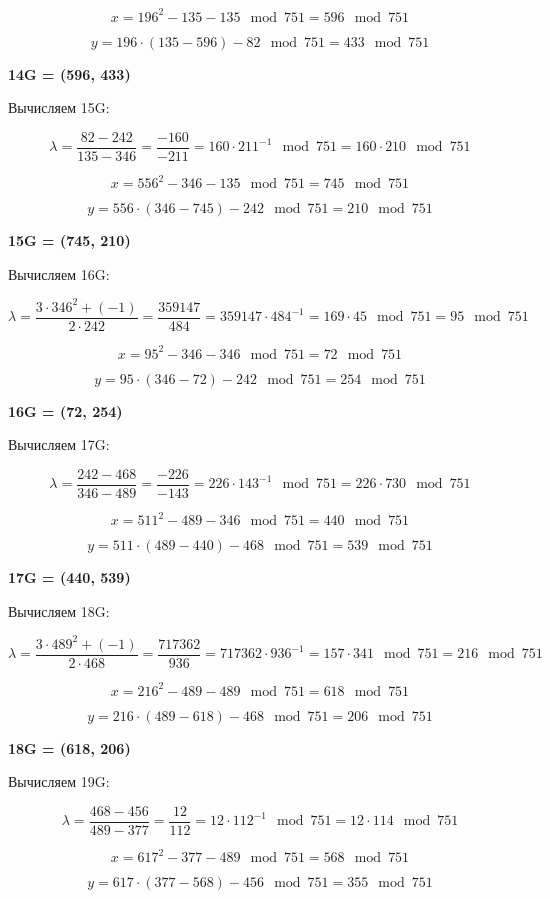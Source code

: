 \[
x = 196^2 - 135 - 135 \mod{751} = 596\mod{751}
\]


\[
y = 196 \cdot (135 - 596) - 82\mod{751} = 433\mod{751}
\]

\textbf{14G = (596, 433)}

Вычисляем 15G:

\[
\lambda = \frac{82-242}{135-346} = \frac{-160}{-211} = 160 \cdot 211^{-1}\mod{751} = 160 \cdot 210\mod{751}
\]


\[
x = 556^2 - 346 - 135 \mod{751} = 745\mod{751}
\]


\[
y = 556 \cdot (346 - 745) - 242\mod{751} = 210\mod{751}
\]

\textbf{15G = (745, 210)}

Вычисляем 16G:

\[
\lambda = \frac{ 3 \cdot 346^2 + (-1) }{2 \cdot 242} = \frac{359147}{484} = 359147 \cdot 484^{-1} = 169 \cdot 45\mod{751} = 95\mod{751}
\]


\[
x = 95^2 - 346 - 346 \mod{751} = 72\mod{751}
\]


\[
y = 95 \cdot (346 - 72) - 242\mod{751} = 254\mod{751}
\]

\textbf{16G = (72, 254)}

Вычисляем 17G:

\[
\lambda = \frac{242-468}{346-489} = \frac{-226}{-143} = 226 \cdot 143^{-1}\mod{751} = 226 \cdot 730\mod{751}
\]


\[
x = 511^2 - 489 - 346 \mod{751} = 440\mod{751}
\]


\[
y = 511 \cdot (489 - 440) - 468\mod{751} = 539\mod{751}
\]

\textbf{17G = (440, 539)}

Вычисляем 18G:

\[
\lambda = \frac{ 3 \cdot 489^2 + (-1) }{2 \cdot 468} = \frac{717362}{936} = 717362 \cdot 936^{-1} = 157 \cdot 341\mod{751} = 216\mod{751}
\]


\[
x = 216^2 - 489 - 489 \mod{751} = 618\mod{751}
\]


\[
y = 216 \cdot (489 - 618) - 468\mod{751} = 206\mod{751}
\]

\textbf{18G = (618, 206)}

Вычисляем 19G:

\[
\lambda = \frac{468-456}{489-377} = \frac{12}{112} = 12 \cdot 112^{-1}\mod{751} = 12 \cdot 114\mod{751}
\]


\[
x = 617^2 - 377 - 489 \mod{751} = 568\mod{751}
\]


\[
y = 617 \cdot (377 - 568) - 456\mod{751} = 355\mod{751}
\]

